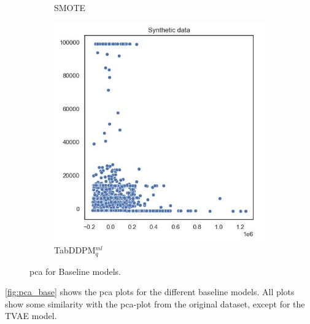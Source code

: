 \begin{figure}[h]
\begin{subfigure}{0.3\textwidth}
		\caption{SMOTE}
	\end{subfigure}
	\begin{subfigure}{0.3\textwidth}
		\centering
		\includegraphics[width=\textwidth]{images/pca/tab-ddpm.jpg}
		\caption{TabDDPM$^{ml}_q$}
	\end{subfigure}
	\caption{\gls{pca} for Baseline models.}
	\label{fig:pca_base}
\end{figure}

\autoref{fig:pca_base} shows the \gls{pca} plots for the different baseline models. All plots show some similarity with the \gls{pca}-plot from the original dataset,
except for the TVAE model.

